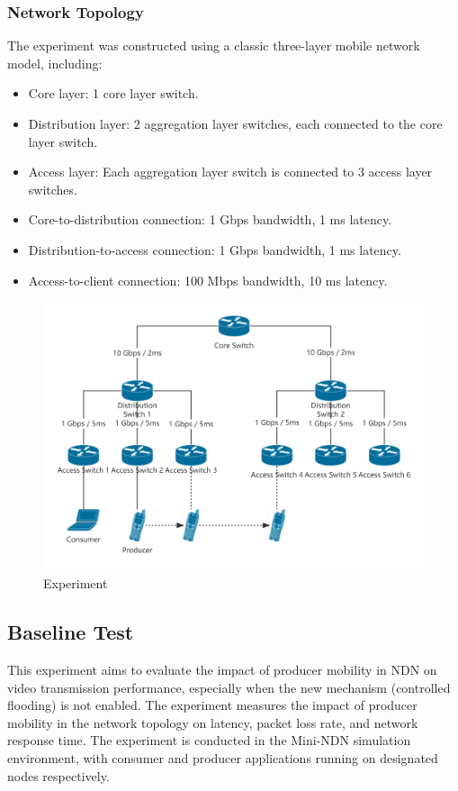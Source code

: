 \documentclass[conference]{IEEEtran}
\begin{document}
\subsubsection{Network Topology}
The experiment was constructed using a classic three-layer mobile network model, including:
\begin{itemize}
    \item Core layer: 1 core layer switch.
    \item Distribution layer: 2 aggregation layer switches, each connected to the core layer switch.
    \item Access layer: Each aggregation layer switch is connected to 3 access layer switches.
    \item Core-to-distribution connection: 1 Gbps bandwidth, 1 ms latency.
    \item Distribution-to-access connection: 1 Gbps bandwidth, 1 ms latency.
    \item Access-to-client connection: 100 Mbps bandwidth, 10 ms latency.
\end{itemize}

\begin{figure}
    \centering
    \includegraphics[width=\columnwidth]{figures/Topology.png}
    \caption{Experiment}
    \label{fig:enter-label}
\end{figure}

\subsection{Baseline Test}
This experiment aims to evaluate the impact of producer mobility in NDN on video transmission performance, especially when the new mechanism (controlled flooding) is not enabled. The experiment measures the impact of producer mobility in the network topology on latency, packet loss rate, and network response time. The experiment is conducted in the Mini-NDN simulation environment, with consumer and producer applications running on designated nodes respectively.
\end{document}
